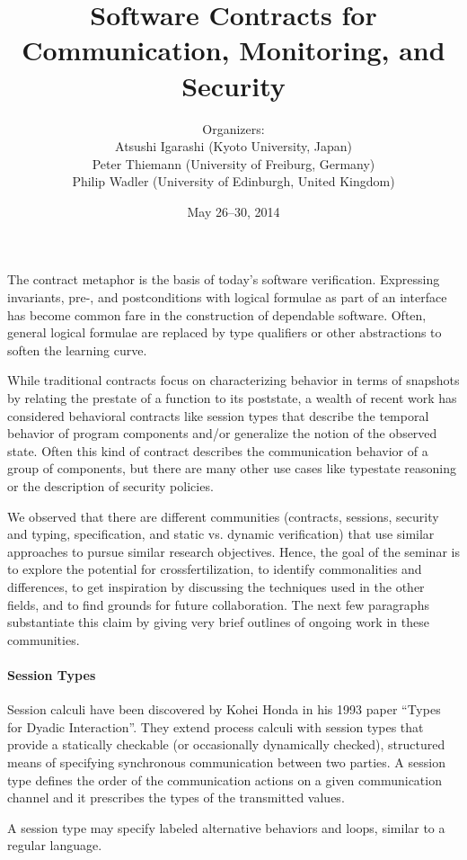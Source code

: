 \documentclass[11pt]{article}
\title{Software Contracts for Communication, Monitoring, and Security}
\author{Organizers: \\
Atsushi Igarashi (Kyoto University, Japan) \\
Peter Thiemann (University of Freiburg, Germany) \\
Philip Wadler (University of Edinburgh, United Kingdom)}
\date{May 26--30, 2014}
\begin{document}
\maketitle

The contract metaphor is the basis of today’s software verification. Expressing invariants, pre-, and postconditions with logical formulae as part of an interface has become common fare in the construction of dependable software. Often, general logical formulae are replaced by type qualifiers or other abstractions to soften the learning curve.

While traditional contracts focus on characterizing behavior in terms of snapshots by relating the
prestate of a function to its poststate, a wealth of recent work has considered behavioral contracts like session types that describe the temporal behavior of program components and/or generalize the notion of the observed state. Often this kind of contract describes the communication behavior of a group of components, but there are many other use cases like typestate reasoning or the description of security policies.

We observed that there are different communities (contracts, sessions, security and typing, specification, and static vs. dynamic verification) that use similar approaches to pursue similar research objectives. Hence, the goal of the seminar is to explore the potential for crossfertilization, to identify commonalities and differences, to get inspiration by discussing the techniques used in the other fields, and to find grounds for future collaboration. The next few paragraphs substantiate this claim by giving very brief outlines of ongoing work in these communities.

\paragraph{Session Types}

Session calculi have been discovered by Kohei Honda in his 1993 paper “Types for Dyadic Interaction”. They extend process calculi with session types that provide a statically checkable (or occasionally dynamically checked), structured means of specifying synchronous communication between two parties. A session type defines the order of the communication actions on a given communication channel and it prescribes the types of the transmitted values.

A session type may specify labeled alternative behaviors and loops, similar to a regular language.
\end{document}
